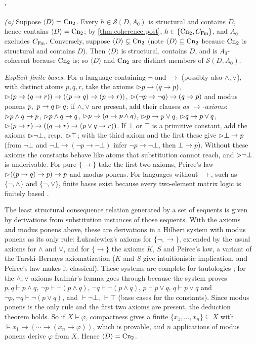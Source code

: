 \paragraph{.} \emph{(a)} Suppose $\langle D\rangle=\mathrm{Cn}_2$. Every $h\in\mathcal S(D,A_0)$ is structural and contains $D$, hence contains $\langle D\rangle=\mathrm{Cn}_2$; by \cref{thm:coherence:post}, $h\in\{\mathrm{Cn}_2,C_{\mathrm{Fm}}\}$, and $A_0$ excludes $C_{\mathrm{Fm}}$. Conversely, suppose $\langle D\rangle\subsetneq\mathrm{Cn}_2$ (note $\langle D\rangle\subseteq\mathrm{Cn}_2$ because $\mathrm{Cn}_2$ is structural and contains $D$). Then $\langle D\rangle$ is structural, contains $D$, and is $A_0$-coherent because $\mathrm{Cn}_2$ is; so $\langle D\rangle$ and $\mathrm{Cn}_2$ are distinct members of $\mathcal S(D,A_0)$.

\emph{Explicit finite bases.} For a language containing $\neg$ and $\to$ (possibly also $\wedge,\vee$), with distinct atoms $p,q,r$, take the axioms $\rhd p\to(q\to p)$, $\rhd(p\to(q\to r))\to((p\to q)\to(p\to r))$, $\rhd(\neg p\to\neg q)\to(q\to p)$ and modus ponens $p,\ p\to q\rhd q$; if $\wedge,\vee$ are present, add their clauses \emph{as $\to$-axioms}: $\rhd p\wedge q\to p$, $\rhd p\wedge q\to q$, $\rhd p\to(q\to p\wedge q)$, $\rhd p\to p\vee q$, $\rhd q\to p\vee q$, $\rhd(p\to r)\to((q\to r)\to(p\vee q\to r))$. If $\bot$ or $\top$ is a primitive constant, add the axioms $\rhd\neg\bot$, resp.\ $\rhd\top$; with the third axiom and the first these give $\rhd\bot\to p$ (from $\neg\bot$ and $\neg\bot\to(\neg p\to\neg\bot)$ infer $\neg p\to\neg\bot$, then $\bot\to p$). Without these axioms the constants behave like atoms that substitution cannot reach, and $\rhd\neg\bot$ is underivable. For pure $\{\to\}$ take the first two axioms, Peirce's law $\rhd((p\to q)\to p)\to p$ and modus ponens. For languages without $\to$, such as $\{\neg,\wedge\}$ and $\{\neg,\vee\}$, finite bases exist because every two-element matrix logic is finitely based \citep{rautenberg1981two}.

The least structural consequence relation generated by a set of sequents is given by derivations from substitution instances of those sequents. With the axioms and modus ponens above, these are derivations in a Hilbert system with modus ponens as its only rule: \L ukasiewicz's axioms for $\{\neg,\to\}$, extended by the usual axioms for $\wedge$ and $\vee$, and for $\{\to\}$ the axioms $K$, $S$ and Peirce's law, a variant of the Tarski--Bernays axiomatization ($K$ and $S$ give intuitionistic implication, and Peirce's law makes it classical). These systems are complete for tautologies \citep{kleene1952introduction,mendelson1964introduction}; for the $\wedge,\vee$ axioms Kalm\'ar's lemma goes through because the system proves $p,q\vdash p\wedge q$, $\neg p\vdash\neg(p\wedge q)$, $\neg q\vdash\neg(p\wedge q)$, $p\vdash p\vee q$, $q\vdash p\vee q$ and $\neg p,\neg q\vdash\neg(p\vee q)$, and $\vdash\neg\bot$, $\vdash\top$ (base cases for the constants). Since modus ponens is the only rule and the first two axioms are present, the deduction theorem holds. So if $X\models\varphi$, compactness gives a finite $\{x_1,\dots,x_n\}\subseteq X$ with $\models x_1\to(\cdots\to(x_n\to\varphi))$, which is provable, and $n$ applications of modus ponens derive $\varphi$ from $X$. Hence $\langle D\rangle=\mathrm{Cn}_2$.

